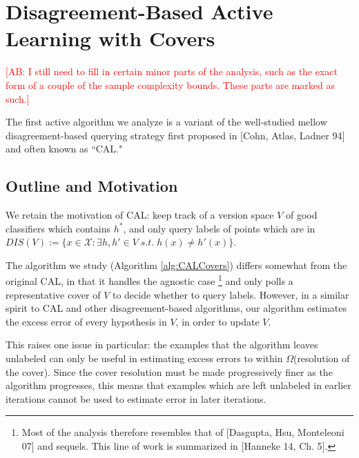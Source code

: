 \documentclass{article}[12pt]
\newcommand{\authcmt}[2]{\ifnum\Comments=1\textcolor{#1}{#2}\fi}
\newcommand{\akshay}[1]{\authcmt{red}      {[AB: #1]}}
\theoremstyle{named}
\newcommand{\cX}{\mathcal{X}}
\begin{document}






\section{Disagreement-Based Active Learning with Covers}

\akshay{I still need to fill in certain minor parts of the analysis, 
such as the exact form of a couple of the sample complexity bounds. 
These parts are marked as such.}

The first active algorithm we analyze is a variant of the well-studied mellow disagreement-based 
querying strategy first proposed in [Cohn, Atlas, Ladner 94] and often known as ``CAL." 


\subsection{Outline and Motivation}

We retain the motivation of CAL: keep track of a version space $V$ of good classifiers 
which contains $h^*$, 
and only query labels of points which are in 
$DIS(V) := \{ x \in \cX : \exists h, h' \in V \;s.t.\; h(x) \neq h'(x) \}$.

The algorithm we study (Algorithm \ref{alg:CALCovers}) differs somewhat from the original CAL, 
in that it handles the agnostic case 
\footnote{ Most of the analysis therefore resembles that of [Dasgupta, Hsu, Monteleoni 07] 
and sequels. 
This line of work is summarized in [Hanneke 14, Ch. 5]. }
and only polls a representative cover of $V$ to decide whether to query labels. 
However, in a similar spirit to CAL and other disagreement-based algorithms, 
our algorithm estimates the excess error of every hypothesis in $V$, 
in order to update $V$.

This raises one issue in particular:
the examples that the algorithm leaves unlabeled can only be useful in estimating excess errors  
to within $\Omega$(resolution of the cover).
Since the cover resolution must be made progressively finer as the algorithm progresses, 
this means that examples which are left unlabeled in earlier iterations 
cannot be used to estimate error in later iterations. 
\end{document}

